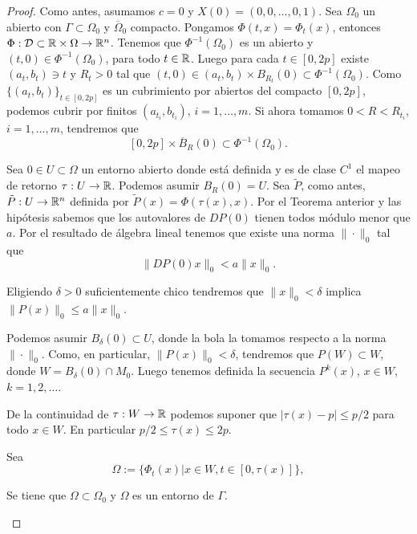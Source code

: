 \begin{proof} Como antes, asumamos $c=0$ y $X(0)=(0,0,\ldots,0,1)$. Sea $\Omega_0$ un abierto con $\Gamma\subset\Omega_0$ y $\overline{\Omega}_0$ compacto. Pongamos
$\Phi(t,x)=\Phi_t(x)$, entonces $\Phi:\mathcal{D}\subset\mathbb{R}\times \Omega\to\mathbb{R}^n$. Tenemos que $\Phi^{-1}(\Omega_0)$ es un abierto y $(t,0)\in\Phi^{-1}(\Omega_0)$, para todo 
$t\in\mathbb{R}$. Luego para cada $t\in[0,2p]$ existe $(a_t,b_t)\ni t$ y $R_t>0$ tal que $(t,0)\in(a_t,b_t)\times B_{R_t}(0)\subset\Phi^{-1}(\Omega_0)$. Como $\{(a_t,b_t)\}_{t\in[0,2p]}$
es un cubrimiento por abiertos del compacto $[0,2p]$, podemos cubrir por finitos $(a_{t_i},b_{t_i})$, $i=1,\ldots,m$. Si ahora tomamos $0<R< R_{t_i}$, $i=1,\ldots,m$, 
tendremos que
\[[0,2p]\times\overline{B}_{R}(0)\subset\Phi^{-1}(\Omega_0).\]





Sea $0\in U\subset\Omega$ un entorno abierto donde está definida y es de clase $C^1$ el mapeo de retorno $\tau:U\to\mathbb{R}$. Podemos asumir $B_R(0)= U$. Sea $\tilde{P}$, como antes, 
$\tilde{P}:U\to\mathbb{R}^n$ definida por $\tilde{P}(x)=\Phi(\tau(x),x)$. Por el Teorema anterior y las hipótesis sabemos que los autovalores de $DP(0)$ tienen todos módulo menor que
$a$. Por el resultado de álgebra lineal tenemos que existe una norma $\|\cdot\|_0$ tal que
\[\|DP(0)x\|_0<a\|x\|_0.\]

\begin{ejercicio}{} Eligiendo $\delta>0$ suficientemente chico tendremos que  $\|x\|_0<\delta$ implica $\|P(x)\|_0\leq a\|x\|_0$. 
 
\end{ejercicio}


Podemos asumir $B_{\delta}(0)\subset U$, donde la bola la tomamos respecto a la norma $\|\cdot\|_0$. Como, en particular, $\|P(x)\|_0<\delta$, tendremos que $P(W)\subset W$,
donde $W=B_{\delta}(0)\cap M_0$. Luego tenemos definida la secuencia $P^k(x)$, $x\in W$, $k=1,2,\ldots$. 






De la continuidad de $\tau:W\to\mathbb{R}$ podemos suponer que $|\tau(x)-p|\leq p/2$ para todo $x\in W$. En particular $p/2\leq \tau(x)\leq 2p$. 

Sea 
\[\Omega:=\{\Phi_t(x)|x\in W, t\in [0,\tau(x)]\},\]

\begin{ejercicio}{}
 Se tiene que $\Omega\subset \Omega_0$ y $\Omega$ es un entorno de $\Gamma$.
\end{ejercicio}






\end{proof}
